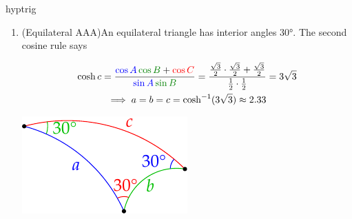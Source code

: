 \begin{examples}{}{hyptrig}
\begin{enumerate}
	 		 	
	 	\item (Equilateral AAA)\lstsp An equilateral triangle has interior angles $\ang{30}$. The second cosine rule says\par
	 	\begin{minipage}[t]{0.65\linewidth}\vspace{-15pt}
	 	\begin{gather*}
	 		\cosh c =\frac{\textcolor{blue}{\cos A}\,\textcolor{Green}{\cos B}+\textcolor{red}{\cos C}}{\textcolor{blue}{\sin A}\,\textcolor{Green}{\sin B}} =\frac{\frac{\sqrt 3}2\cdot\frac{\sqrt 3}2+\frac{\sqrt 3}2}{\frac 12\cdot\frac 12} =3\sqrt 3\\
	 		\implies a=b=c=\cosh^{-1}(3\sqrt 3) \approx 2.33
	 	\end{gather*}
	  \end{minipage}
	  \hfill
	  \begin{minipage}[t]{0.34\linewidth}\vspace{-8pt}
	  	\flushright\includegraphics[scale=0.95]{isom-trigequil}
	  \end{minipage}
	 	

\end{enumerate}
\end{examples}
